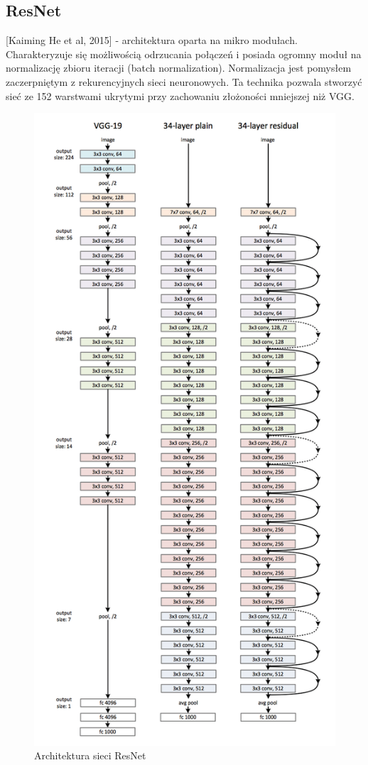 \documentclass[a4paper,twoside,titlepage,openright]{book}
\begin{document}
\subsection{ResNet}
[Kaiming He et al, 2015]  - architektura oparta na mikro modułach. Charakteryzuje się możliwością odrzucania połączeń i posiada ogromny moduł na normalizację zbioru iteracji (batch normalization). Normalizacja jest pomysłem zaczerpniętym z rekurencyjnych sieci neuronowych. Ta technika pozwala stworzyć sieć ze 152 warstwami ukrytymi przy zachowaniu złożoności mniejszej niż VGG.
\begin{figure}[h]
	\centering
			\includegraphics[resolution=120]{ResNet.png}
		\caption{Architektura sieci ResNet}
\end{figure}
\end{document}
